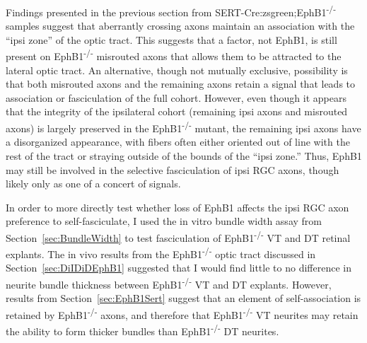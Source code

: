 \label{sec:EphB1invitro}
Findings presented in the previous section from SERT-Cre:zsgreen;EphB1\textsuperscript{-/-} samples suggest that aberrantly crossing axons maintain an association with the ``ipsi zone'' of the optic tract.
This suggests that a factor, not EphB1, is still present on EphB1\textsuperscript{-/-} misrouted axons that allows them to be attracted to the lateral optic tract.
An alternative, though not mutually exclusive, possibility is that both misrouted axons and the remaining axons retain a signal that leads to association or fasciculation of the full cohort.
However, even though it appears that the integrity of the ipsilateral cohort (remaining ipsi axons and misrouted axons) is largely preserved in the EphB1\textsuperscript{-/-} mutant, the remaining ipsi axons have a disorganized appearance, with fibers often either oriented out of line with the rest of the tract or straying outside of the bounds of the ``ipsi zone.''
Thus, EphB1 may still be involved in the selective fasciculation of ipsi RGC axons, though likely only as one of a concert of signals.

In order to more directly test whether loss of EphB1 affects the ipsi RGC axon preference to self-fasciculate, I used the in vitro bundle width assay from Section~\ref{sec:BundleWidth} to test fasciculation of EphB1\textsuperscript{-/-} VT and DT retinal explants.
The in vivo results from the EphB1\textsuperscript{-/-} optic tract discussed in Section~\ref{sec:DiIDiDEphB1} suggested that I would find little to no difference in neurite bundle thickness between EphB1\textsuperscript{-/-} VT and DT explants.
However, results from Section~\ref{sec:EphB1Sert} suggest that an element of self-association is retained by EphB1\textsuperscript{-/-} axons, and therefore that EphB1\textsuperscript{-/-} VT neurites may retain the ability to form thicker bundles than EphB1\textsuperscript{-/-} DT neurites.

